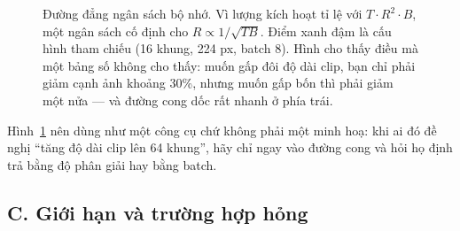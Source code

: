 \documentclass[../../../deep_learning.tex]{subfiles}
\begin{document}
\begin{figure}[H]\centering
{}
\caption{Đường đẳng ngân sách bộ nhớ. Vì lượng kích hoạt tỉ lệ với \(T \cdot R^2 \cdot B\), một ngân sách cố định cho \(R \propto 1/\sqrt{T B}\). Điểm xanh đậm là cấu hình tham chiếu (16 khung, 224 px, batch 8). Hình cho thấy điều mà một bảng số không cho thấy: muốn gấp đôi độ dài clip, bạn chỉ phải giảm cạnh ảnh khoảng 30\%, nhưng muốn gấp bốn thì phải giảm một nửa --- và đường cong dốc rất nhanh ở phía trái.}
\label{fig:video-budget}
\end{figure}

Hình~\ref{fig:video-budget} nên dùng như một công cụ chứ không phải một minh hoạ: khi ai đó đề nghị ``tăng độ dài clip lên 64 khung'', hãy chỉ ngay vào đường cong và hỏi họ định trả bằng độ phân giải hay bằng batch.

\subsection{C. Giới hạn và trường hợp hỏng}
\end{document}
